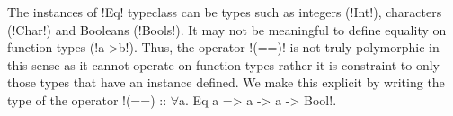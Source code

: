 \documentclass[format=sigplan,manuscript,review,screen,nonacm,margin=1in]{acmart}
\begin{document}
The instances of !Eq! typeclass can be types such as integers (!Int!), characters (!Char!) and Booleans (!Bools!).
It may not be meaningful to define equality on function types (!a->b!). Thus, the operator
!(==)! is not truly polymorphic in this sense as it cannot operate on function types rather
it is constraint to only those types that have an instance defined. We make this explicit by writing
the type of the operator !(==) :: $\forall$a. Eq a => a -> a -> Bool!. 

\end{document}
